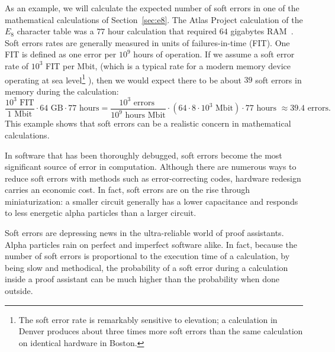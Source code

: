 \documentclass{llncs}
\begin{document}
As an example, we will calculate the expected
number of soft errors in one of the mathematical calculations of
Section~\ref{sec:e8}.  The Atlas Project calculation of
the $E_8$ character table was a $77$ hour calculation that required
$64$ gigabytes RAM~\cite{AtlasSlides}.  Soft errors rates are generally measured in units
of failures-in-time (FIT). One FIT is defined as one error per $10^9$
hours of operation.
If we assume a soft error rate of $10^3$ FIT per Mbit, (which is a
typical rate for a modern memory device operating at sea
level\footnote{The soft error rate is remarkably sensitive to
  elevation; a calculation in Denver produces about three times more
  soft errors than the same calculation on identical hardware in Boston.}
\cite{WP}),
 then we would expect there to be about $39$ soft
errors in memory during the calculation:
\[
\frac{10^3 \text{~FIT}}{1\text{~Mbit}} \cdot 64 \text{~GB} \cdot 77\text{~hours} =
\frac{10^3 \text{~errors~}}{10^9\text{~hours~}\text{Mbit}} \cdot
({64\cdot 8\cdot 10^3 \text{~Mbit}}) \cdot 77\text{~hours~} 
\approx 39.4 \text{~errors}.
\]
This example shows that soft errors can be a realistic concern in
mathematical calculations.

In software that has been thoroughly debugged, soft errors become the
most significant source of error in computation.  Although there are
numerous ways to reduce soft errors with methods such as error-correcting
codes, hardware redesign carries an economic cost.  In fact, soft errors are on
the rise through miniaturization: a smaller circuit generally has a lower
capacitance and responds to less energetic alpha particles than a larger
circuit.

Soft errors are depressing news in the ultra-reliable world of proof
assistants.  Alpha particles rain on perfect and imperfect software
alike.  In fact, because the number of
soft errors is proportional to the execution time of a calculation, by being
slow and methodical, the probability of a soft error during a
calculation inside a proof assistant can be much higher than the
probability when done outside.  
\end{document}
